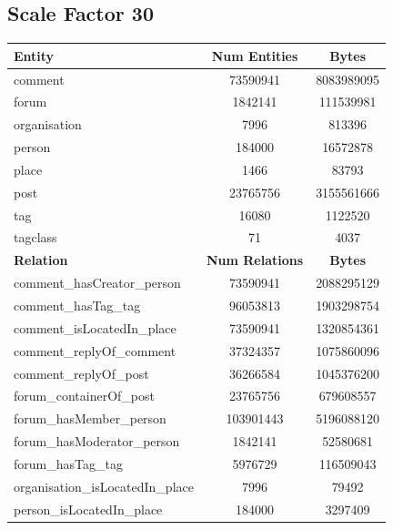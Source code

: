 \subsection{Scale Factor 30}
\begin{table}[H]
    \centering
    \begin{tabular} {| l | c | c |}
        \hline
        \textbf{Entity} & \textbf{Num Entities} & \textbf{Bytes} \\
        \hline
        \hline
        comment & 73590941 & 8083989095 \\
        \hline
        forum & 1842141 & 111539981 \\
        \hline
        organisation & 7996 & 813396 \\
        \hline
        person & 184000 & 16572878 \\
        \hline
        place & 1466 & 83793 \\
        \hline
        post & 23765756 & 3155561666 \\
        \hline
        tag & 16080 & 1122520 \\
        \hline
        tagclass & 71 & 4037 \\
        \hline
        \hline
        \textbf{Relation} & \textbf{Num Relations} & \textbf{Bytes} \\
        \hline
        \hline
        comment\_hasCreator\_person & 73590941 & 2088295129 \\
        \hline
        comment\_hasTag\_tag & 96053813 & 1903298754 \\
        \hline
        comment\_isLocatedIn\_place & 73590941 & 1320854361 \\
        \hline
        comment\_replyOf\_comment & 37324357 & 1075860096 \\
        \hline
        comment\_replyOf\_post & 36266584 & 1045376200 \\
        \hline
        forum\_containerOf\_post & 23765756 & 679608557 \\
        \hline
        forum\_hasMember\_person & 103901443 & 5196088120 \\
        \hline
        forum\_hasModerator\_person & 1842141 & 52580681 \\
        \hline
        forum\_hasTag\_tag & 5976729 & 116509043 \\
        \hline
        organisation\_isLocatedIn\_place & 7996 & 79492 \\
        \hline
        person\_isLocatedIn\_place & 184000 & 3297409 \\

\end{tabular}
\end{table}

